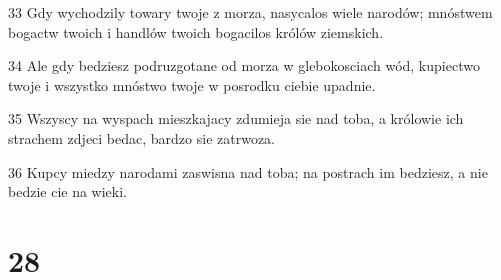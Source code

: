 \par 33 Gdy wychodzily towary twoje z morza, nasycalos wiele narodów; mnóstwem bogactw twoich i handlów twoich bogacilos królów ziemskich.
\par 34 Ale gdy bedziesz podruzgotane od morza w glebokosciach wód, kupiectwo twoje i wszystko mnóstwo twoje w posrodku ciebie upadnie.
\par 35 Wszyscy na wyspach mieszkajacy zdumieja sie nad toba, a królowie ich strachem zdjeci bedac, bardzo sie zatrwoza.
\par 36 Kupcy miedzy narodami zaswisna nad toba; na postrach im bedziesz, a nie bedzie cie na wieki.

\chapter{28}

